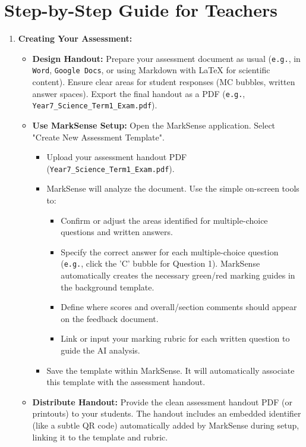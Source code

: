 \documentclass[11pt, a4paper]{article}
\begin{document}
\section*{Step-by-Step Guide for Teachers}
\begin{enumerate} %
    \item \textbf{Creating Your Assessment:}
        \begin{itemize} %
            \item \textbf{Design Handout:} Prepare your assessment document as usual (\texttt{e.g.}, in \texttt{Word}, \texttt{Google Docs}, or using Markdown with \LaTeX{} for scientific content). Ensure clear areas for student responses (MC bubbles, written answer spaces). Export the final handout as a PDF (\texttt{e.g.}, \texttt{Year7\_Science\_Term1\_Exam.pdf}).
            \item \textbf{Use MarkSense Setup:} Open the MarkSense application. Select "Create New Assessment Template".
                \begin{itemize} %
                    \item Upload your assessment handout PDF (\texttt{Year7\_Science\_Term1\_Exam.pdf}).
                    \item MarkSense will analyze the document. Use the simple on-screen tools to:
                        \begin{itemize} %
                            \item Confirm or adjust the areas identified for multiple-choice questions and written answers.
                            \item Specify the correct answer for each multiple-choice question (\texttt{e.g.}, click the 'C' bubble for Question 1). MarkSense automatically creates the necessary green/red marking guides in the background template.
                            \item Define where scores and overall/section comments should appear on the feedback document.
                            \item Link or input your marking rubric for each written question to guide the AI analysis.
                        \end{itemize} %
                    \item Save the template within MarkSense. It will automatically associate this template with the assessment handout.
                \end{itemize} %
            \item \textbf{Distribute Handout:} Provide the clean assessment handout PDF (or printouts) to your students. The handout includes an embedded identifier (like a subtle QR code) automatically added by MarkSense during setup, linking it to the template and rubric.
        \end{itemize} %


\end{enumerate}
\end{document}
